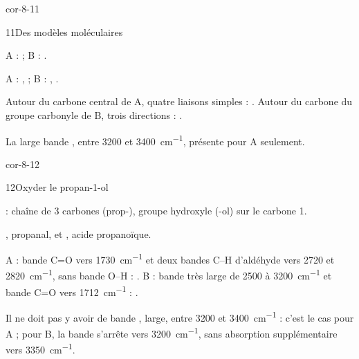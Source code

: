 \begin{blocLivre}{cor-8-11}
\begin{corrige}{11}{Des modèles moléculaires}
\begin{questions}
\item A :  ; B : .
\item A : ,  ; B : , .
\item Autour du carbone central de A, quatre liaisons simples : . Autour du carbone du groupe carbonyle de B,
trois directions : .
\item La large bande , entre 3200 et \qty{3400}{cm^{-1}}, présente pour A seulement.
\end{questions}
\end{corrige}
\end{blocLivre}
\begin{blocLivre}{cor-8-12}
\begin{corrige}{12}{Oxyder le propan-1-ol}
\begin{questions}
\item {} : chaîne de 3 carbones (prop-), groupe hydroxyle (-ol) sur le carbone 1.
\item {}, propanal, et , acide propanoïque.
\item A : bande C=O vers \qty{1730}{cm^{-1}} et deux bandes C--H d'aldéhyde vers 2720 et \qty{2820}{cm^{-1}}, sans bande O--H : .
B : bande très large de 2500 à \qty{3200}{cm^{-1}} et bande C=O vers \qty{1712}{cm^{-1}} : .
\item Il ne doit pas y avoir de bande , large, entre 3200 et \qty{3400}{cm^{-1}} : c'est le cas pour A ; pour B, la bande
s'arrête vers \qty{3200}{cm^{-1}}, sans absorption supplémentaire vers \qty{3350}{cm^{-1}}.
\end{questions}
\end{corrige}
\end{blocLivre}

